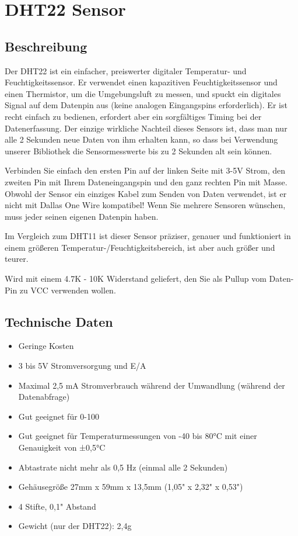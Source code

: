 \documentclass[conference]{IEEEtran}
\begin{document}
\section{DHT22 Sensor}

\subsection{Beschreibung}
Der DHT22 ist ein einfacher, preiswerter digitaler Temperatur- und Feuchtigkeitssensor. Er verwendet einen kapazitiven Feuchtigkeitssensor und einen Thermistor, um die Umgebungsluft zu messen, und spuckt ein digitales Signal auf dem Datenpin aus (keine analogen Eingangspins erforderlich). Er ist recht einfach zu bedienen, erfordert aber ein sorgfältiges Timing bei der Datenerfassung. Der einzige wirkliche Nachteil dieses Sensors ist, dass man nur alle 2 Sekunden neue Daten von ihm erhalten kann, so dass bei Verwendung unserer Bibliothek die Sensormesswerte bis zu 2 Sekunden alt sein können.

Verbinden Sie einfach den ersten Pin auf der linken Seite mit 3-5V Strom, den zweiten Pin mit Ihrem Dateneingangspin und den ganz rechten Pin mit Masse. Obwohl der Sensor ein einziges Kabel zum Senden von Daten verwendet, ist er nicht mit Dallas One Wire kompatibel! Wenn Sie mehrere Sensoren wünschen, muss jeder seinen eigenen Datenpin haben.

Im Vergleich zum DHT11 ist dieser Sensor präziser, genauer und funktioniert in einem größeren Temperatur-/Feuchtigkeitsbereich, ist aber auch größer und teurer.

Wird mit einem 4.7K - 10K Widerstand geliefert, den Sie als Pullup vom Daten-Pin zu VCC verwenden wollen.

\subsection{Technische Daten}
\begin{itemize}
	\item Geringe Kosten
	\item 3 bis 5V Stromversorgung und E/A
	\item Maximal 2,5 mA Stromverbrauch während der Umwandlung (während der Datenabfrage)
	\item Gut geeignet für 0-100%
	\item Gut geeignet für Temperaturmessungen von -40 bis 80°C mit einer Genauigkeit von ±0,5°C
	\item Abtastrate nicht mehr als 0,5 Hz (einmal alle 2 Sekunden)
	\item Gehäusegröße 27mm x 59mm x 13,5mm (1,05" x 2,32" x 0,53")
	\item 4 Stifte, 0,1" Abstand 
	\item Gewicht (nur der DHT22): 2,4g
\end{itemize}
\end{document}
